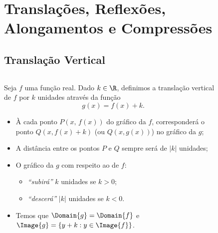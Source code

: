 \section{Translações, Reflexões, Alongamentos e Compressões}

\subsection{Translação Vertical}
\begin{frame}
  \begin{columns}[onlytextwidth]
    \begin{column}{0.49\textwidth}\vspace*{-0.5cm}
      \begin{definition}
        Seja $f$ uma função real. Dado $k\in\R$, definimos a translação vertical de $f$ por $k$ unidades através da função
        \begin{equation*}
          g(x) = f(x) + k.
        \end{equation*}
      \end{definition}
      \vspace*{-0.2cm}
      \begin{itemize}
       \item À cada ponto $P(x,\,f(x))$ do gráfico da $f$, corresponderá o ponto $Q(x,f(x)+k)$ (ou $Q(x,g(x))$) no gráfico da $g$;
        \item A distância entre os pontos $P$ e $Q$ sempre será de $|k|$ unidades;
        \item O gráfico da $g$ com respeito ao de $f$:
        \begin{itemize}
          \item \emph{``subirá''} $k$ unidades se $k>0$;
          \item<2> \emph{``descerá''} $|k|$ unidades se $k<0$.
        \end{itemize}
        \item Temos que $\Domain{g} = \Domain{f}$ e $\Image{g}=\{y+k:y\in\Image{f}\}$.
      \end{itemize}
    \end{column}
    \begin{column}{0.49\textwidth}
      \begin{figure}
      \end{figure}
    \end{column}
  \end{columns}
\end{frame}


